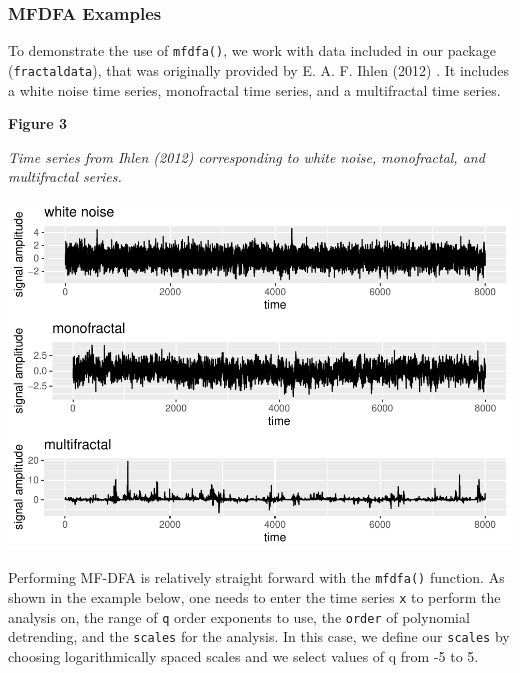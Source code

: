 \documentclass[
  man]{apa6}
\begin{document}
\hypertarget{mfdfa-examples}{%
\subsubsection{MFDFA Examples}\label{mfdfa-examples}}

To demonstrate the use of \texttt{mfdfa()}, we work with data included in our
package (\texttt{fractaldata}), that was originally provided by
E. A. F. Ihlen (2012) . It includes a white noise
time series, monofractal time series, and a multifractal time series.

\textbf{Figure 3}

\emph{Time series from Ihlen (2012) corresponding to white noise,
monofractal, and multifractal series.}

\includegraphics{fractal_regression_paper_brm_files/figure-latex/unnamed-chunk-7-1.pdf}

Performing MF-DFA is relatively straight forward with the \texttt{mfdfa()}
function. As shown in the example below, one needs to enter the time
series \texttt{x} to perform the analysis on, the range of \texttt{q} order exponents
to use, the \texttt{order} of polynomial detrending, and the \texttt{scales} for the
analysis. In this case, we define our \texttt{scales} by choosing
logarithmically spaced scales and we select values of q from -5 to 5.
\end{document}
